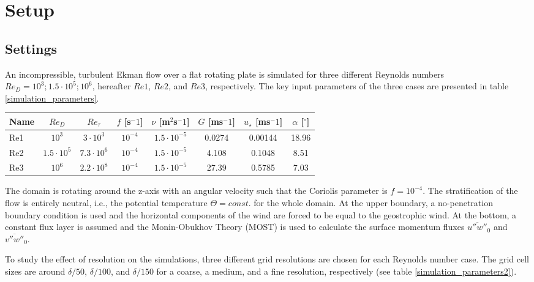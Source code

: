 \documentclass[a4paper,11pt]{article}
\begin{document}
\section{Setup}

\subsection{Settings}

An incompressible, turbulent Ekman flow over a flat rotating plate is simulated for three different Reynolds numbers $Re_D = 10^3;1.5\cdot 10^5;10^6$, hereafter $Re1$, $Re2$, and $Re3$, respectively. The key input parameters of the three cases are presented in table \ref{simulation_parameters}.

\begin{table*}
	\centering
	\caption{Key parameters of the simulated cases. $f$, $\nu$, and $G$ are input parameters, while $u_\star$ and $\alpha$ are the expected results according to \cite{spalart1989theoretical}}
	\begin{tabular}{lccccccc}
          \toprule  
	  Name & $Re_D$ & $Re_\tau$ & $f$ [s$^-1$] & $\nu$ [m$^2$s$^-1$] & $G$ [ms$^-1$] & $u_\star$ [ms$^-1$] & $\alpha$ [$^\circ$] \\
          \midrule
          \midrule
	  Re1 & $10^3$ & $3\cdot10^3$ & $10^{-4}$ & $1.5\cdot10^{-5}$ & 0.0274 & 0.00144 & 18.96 \\
	  Re2 & $1.5\cdot10^5$ & $7.3\cdot10^6$ & $10^{-4}$ & $1.5\cdot10^{-5}$ & 4.108 & 0.1048 & 8.51 \\
	  Re3 & $10^6$ & $2.2\cdot10^8$ & $10^{-4}$ & $1.5\cdot10^{-5}$ & 27.39 & 0.5785 & 7.03 \\
          \bottomrule
	\end{tabular}
	\label{simulation_parameters}
\end{table*}

The domain is rotating around the z-axis with an angular velocity such that the Coriolis parameter is $f=10^{-4}$. The stratification of the flow is entirely neutral, i.e., the potential temperature $\Theta=const.$ for the whole domain. At the upper boundary, a no-penetration boundary condition is used and the horizontal components of the wind are forced to be equal to the geostrophic wind. At the bottom, a constant flux layer is assumed and the Monin-Obukhov Theory (MOST) is used to calculate the surface momentum fluxes $\overline{u''w''}_0$ and $\overline{v''w''}_0$.

To study the effect of resolution on the simulations, three different grid resolutions are chosen for each Reynolds number case. The grid cell sizes are around $\delta/50$, $\delta/100$, and $\delta/150$ for a coarse, a medium, and a fine resolution, respectively (see table \ref{simulation_parameters2}). 
\end{document}
